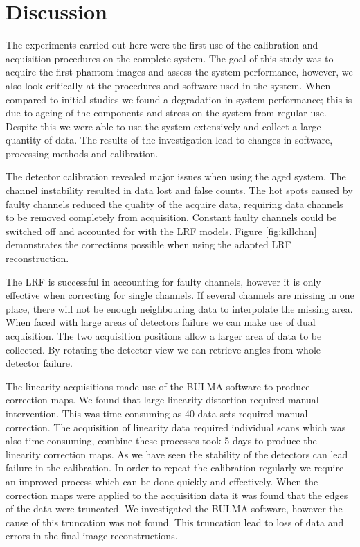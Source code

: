 \section{Discussion}
The experiments carried out here were the first use of the calibration and acquisition procedures on the complete system. The goal of this study was to acquire the first phantom images and assess the system performance, however, we also look critically at the procedures and software used in the system. When compared to initial studies \cite{Michele} we found a degradation in system performance; this is due to ageing of the components and stress on the system from regular use. Despite this we were able to use the system extensively and collect a large quantity of data. The results of the investigation lead to changes in software, processing methods and calibration. 

The detector calibration revealed major issues when using the aged system. The channel instability resulted in data lost and false counts. The hot spots caused by faulty channels reduced the quality of the acquire data, requiring data channels to be removed completely from acquisition. Constant faulty channels could be switched off and accounted for with the \acrshort{LRF} models. Figure \ref{fig:killchan} demonstrates the corrections possible when using the adapted \acrshort{LRF} reconstruction. 

The \acrshort{LRF} is successful in accounting for faulty channels, however it is only effective when correcting for single channels. If several channels are missing in one place, there will not be enough neighbouring data to interpolate the missing area. When faced with large areas of detectors failure we can make use of dual acquisition. The two acquisition positions allow a larger area of data to be collected. By rotating the detector view we can retrieve angles from whole detector failure.

The linearity acquisitions made use of the BULMA software to produce correction maps. We found that large linearity distortion required manual intervention. This was time consuming as 40 data sets required manual correction. The acquisition of linearity data required individual scans which was also time consuming, combine these processes took 5 days to produce the linearity correction maps. As we have seen the stability of the detectors can lead failure in the calibration. In order to repeat the calibration regularly we require an improved process which can be done quickly and effectively. When the correction maps were applied to the acquisition data it was found that the edges of the data were truncated. We investigated the BULMA software, however the cause of this truncation was not found. This truncation lead to loss of data and errors in the final image reconstructions. 

